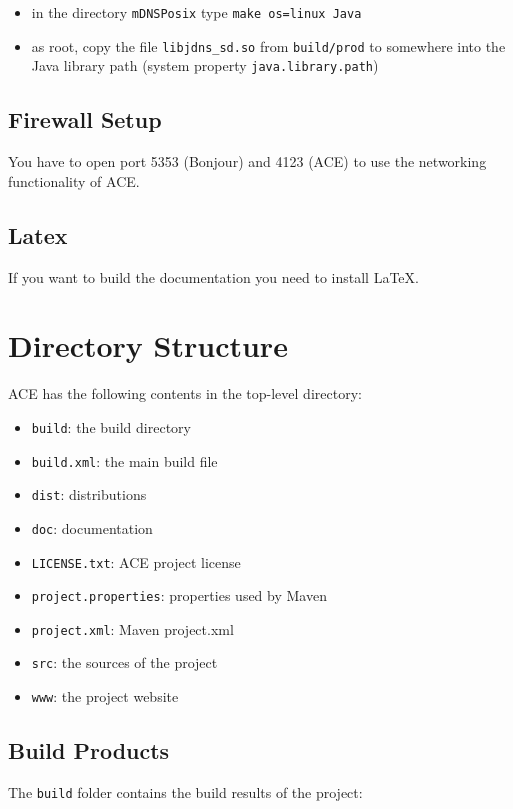 \documentclass[11pt,a4paper]{article}
\begin{document}
\begin{itemize}
 \item in the directory \texttt{mDNSPosix} type \texttt{make os=linux Java}
 \item as root, copy the file \texttt{libjdns\_sd.so} from \texttt{build/prod} to somewhere into the Java library path (system property \texttt{java.library.path})
\end{itemize}


\subsection{Firewall Setup}
You have to open port 5353 (Bonjour) and 4123 (ACE) to use the networking functionality of ACE.


\subsection{Latex}
If you want to build the documentation you need to install \LaTeX{}.



\section{Directory Structure}
ACE has the following contents in the top-level directory:

\begin{itemize}
 \item \texttt{build}: the build directory
 \item \texttt{build.xml}: the main build file
 \item \texttt{dist}: distributions
 \item \texttt{doc}: documentation
 \item \texttt{LICENSE.txt}: ACE project license
 \item \texttt{project.properties}: properties used by Maven
 \item \texttt{project.xml}: Maven project.xml
 \item \texttt{src}: the sources of the project
 \item \texttt{www}: the project website
\end{itemize}


\subsection{Build Products}
The \texttt{build} folder contains the build results of the project:
\end{document}
